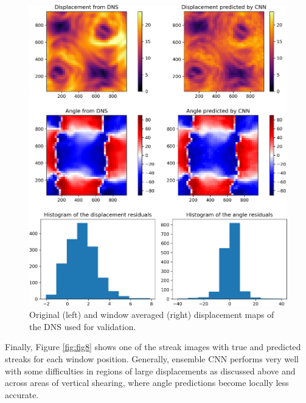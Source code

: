 \documentclass{svjour3}                     %
\begin{document}
\begin{figure}
\includegraphics[width=\textwidth]{figs/figure6.png}
\caption{Original (left) and window averaged (right) displacement maps of the DNS \cite{plumley2016effects} used for validation.}
\label{fig:fig7}
\end{figure}

Finally, Figure \ref{fig:fig8} shows one of the streak images with true and predicted streaks for each window position. Generally, ensemble CNN performs very well with some difficulties in regions of large displacements as discussed above and across areas of vertical shearing, where angle predictions become locally less accurate.
\end{document}
